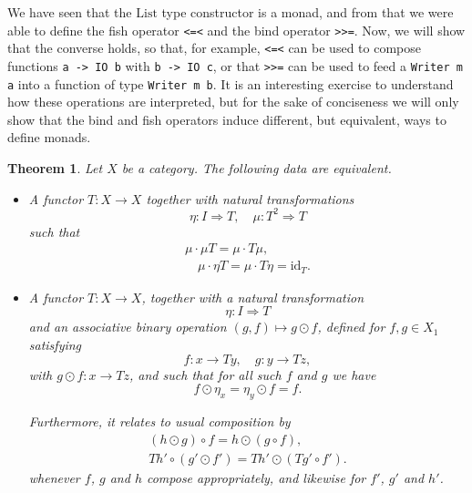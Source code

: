 \documentclass[11pt]{article}
\newtheorem{theorem}{Theorem}
\theoremstyle{nonumberplain}
\newcommand{\type}[1]{\mathrm{#1}}
\newcommand{\id}{\mathrm{id}}
\newcommand*\lsin{\lstinline}
\begin{document}
We have seen that the $\type{List}$ type constructor is a monad, and from that we were able to define the fish operator \lsin|<=<| and the bind operator \lsin|>>=|. Now, we will show that the converse holds, so that, for example, \lsin|<=<| can be used to compose functions \lsin|a -> IO b| with \lsin|b -> IO c|, or that \lsin|>>=| can be used to feed a \lsin|Writer m a| into a function of type \lsin|Writer m b|. It is an interesting exercise to understand how these operations are interpreted, but for the sake of conciseness we will only show that the bind and fish operators induce different, but equivalent, ways to define monads.

\begin{theorem}\label{thm:mon1}
Let $X$ be a category. The following data are equivalent.
\begin{itemize}
\item A functor $T \colon X \to X$ together with natural transformations
\begin{equation}
\eta \colon I \Rightarrow T, \quad \mu \colon T^2 \Rightarrow T
\end{equation}
such that
\begin{gather}
\mu \cdot \mu T = \mu \cdot T \mu, \label{eq:mu1}\\
\quad \mu \cdot \eta T = \mu \cdot T \eta = \id_T. \label{eq:mu2}
\end{gather}

\item A functor $T \colon X \to X$, together with a natural transformation
\begin{equation}
\eta \colon I \Rightarrow T
\end{equation}
and an associative binary operation $(g,f) \mapsto g \odot f$, defined for $f, g \in X_1$ satisfying
\begin{equation}
f \colon x \to T y, \quad g \colon y \to T z,
\end{equation}
with $g \odot f \colon x \to Tz$, and such that for all such $f$ and $g$ we have
\begin{equation}
f \odot \eta_x = \eta_y \odot f = f.
\end{equation}

Furthermore, it relates to usual composition by
\begin{gather}
(h \odot g) \circ f = h \odot (g \circ f),\label{eq:odot3}\\
Th' \circ (g' \odot f') = Th' \odot (Tg' \circ f').\label{eq:odot4}
\end{gather}
whenever $f$, $g$ and $h$ compose appropriately, and likewise for $f'$, $g'$ and $h'$.


\end{itemize}
\end{theorem}
\end{document}

